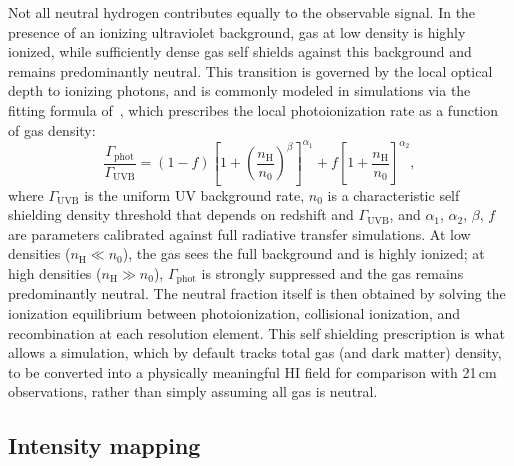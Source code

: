 Not all neutral hydrogen contributes equally to the observable signal. In the presence of an ionizing ultraviolet background, gas at low density is highly
ionized, while sufficiently dense gas self shields against this background and remains predominantly neutral. This transition is governed by the local optical depth to ionizing photons, and is commonly modeled in simulations via the fitting formula of~\citet{Rahmati_2013}, which prescribes the local
photoionization rate as a function of gas density:
\begin{equation}
    \frac{\Gamma_{\mathrm{phot}}}{\Gamma_{\mathrm{UVB}}}
    = (1 - f)\!\left[1 + \left(\frac{n_{\mathrm{H}}}{n_0}\right)^{\!\beta}\right]^{\alpha_1}
    + f\!\left[1 + \frac{n_{\mathrm{H}}}{n_0}\right]^{\alpha_2},
    \label{eq:rahmati}
\end{equation}
where $\Gamma_{\mathrm{UVB}}$ is the uniform UV background rate, $n_0$ is a characteristic self shielding density threshold that depends on redshift and $\Gamma_{\mathrm{UVB}}$, and $\alpha_1$, $\alpha_2$, $\beta$, $f$
are parameters calibrated against full radiative transfer simulations. At low densities ($n_{\mathrm{H}} \ll n_0$), the gas sees the full background and is highly ionized; at high densities ($n_{\mathrm{H}} \gg n_0$), $\Gamma_{\mathrm{phot}}$ is strongly suppressed and the gas remains predominantly neutral. The neutral fraction itself is then obtained by solving the ionization equilibrium between photoionization, collisional ionization, and recombination at each resolution element. This self shielding prescription is
what allows a simulation, which by default tracks total gas (and dark matter) density, to be converted into a physically meaningful HI field for comparison
with 21\,cm observations, rather than simply assuming all gas is neutral.


\subsection{Intensity mapping}

